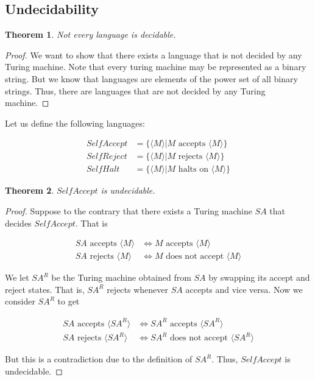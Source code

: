\documentclass[11pt]{article}
\theoremstyle{plain} %
\newtheorem*{theorem}{Theorem}
\theoremstyle{definition}
\theoremstyle{example}
\theoremstyle{remark}
\begin{document}
\subsection{Undecidability}

\begin{theorem}
Not every language is decidable.
\end{theorem}


\begin{proof}
We want to show that there exists a language that is not decided by any Turing machine. Note that every turing machine may be represented as a binary string. But we know that languages are elements of the power set of all binary strings. Thus, there are languages that are not decided by any Turing machine.
\end{proof}

Let us define the following languages:

\begin{align*}
SelfAccept &= \{ \langle M \rangle | M \text{ accepts } \langle M \rangle \} \\
SelfReject &= \{ \langle M \rangle | M \text{ rejects }\langle M \rangle \}\\
SelfHalt &= \{\langle M \rangle | M \text{ halts on } \langle M \rangle \}
\end{align*}

\begin{theorem}
$SelfAccept$ is undecidable.
\end{theorem}

\begin{proof}
Suppose to the contrary that there exists a Turing machine $SA$ that decides $SelfAccept$. That is

\begin{align*}
SA \text{ accepts } \langle M \rangle &\iff M \text{ accepts } \langle M \rangle\\
SA \text{ rejects } \langle M \rangle &\iff M \text{ does not accept } \langle M \rangle
\end{align*}

We let $SA^R$ be the Turing machine obtained from $SA$ by swapping its accept and reject states. That is, $SA^R$ rejects whenever $SA$ accepts and vice versa. Now we consider $SA^R$ to get

\begin{align*}
SA \text{ accepts } \langle SA^R\rangle &\iff SA^R \text{ accepts } \langle SA^R\rangle\\
SA \text{ rejects } \langle SA^R \rangle &\iff SA^R \text{ does not accept } \langle SA^R \rangle
\end{align*}

But this is a contradiction due to the definition of $SA^R$. Thus, $SelfAccept$ is undecidable.
\end{proof}
\end{document}
